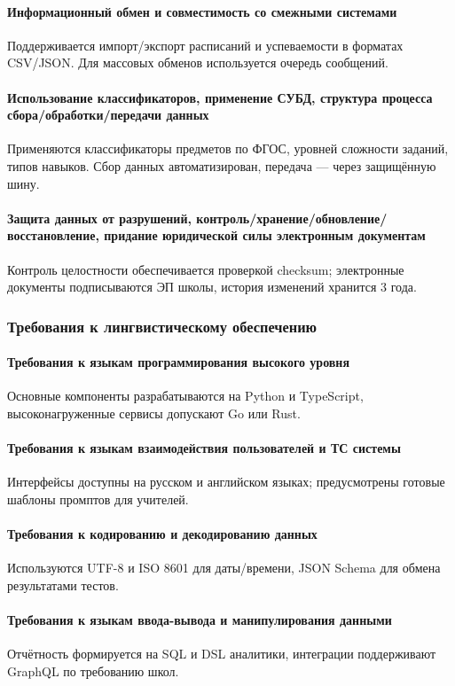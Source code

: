 \documentclass[14pt,a4paper]{extarticle}
\begin{document}
\paragraph{Информационный обмен и совместимость со смежными системами} Поддерживается импорт/экспорт расписаний и успеваемости в форматах CSV/JSON. Для массовых обменов используется очередь сообщений.
\paragraph{Использование классификаторов, применение СУБД, структура процесса сбора/обработки/передачи данных} Применяются классификаторы предметов по ФГОС, уровней сложности заданий, типов навыков. Сбор данных автоматизирован, передача — через защищённую шину.
\paragraph{Защита данных от разрушений, контроль/хранение/обновление/восстановление, придание юридической силы электронным документам} Контроль целостности обеспечивается проверкой checksum; электронные документы подписываются ЭП школы, история изменений хранится 3 года.

\subsubsection{Требования к лингвистическому обеспечению}
\paragraph{Требования к языкам программирования высокого уровня} Основные компоненты разрабатываются на Python и TypeScript, высоконагруженные сервисы допускают Go или Rust.
\paragraph{Требования к языкам взаимодействия пользователей и ТС системы} Интерфейсы доступны на русском и английском языках; предусмотрены готовые шаблоны промптов для учителей.
\paragraph{Требования к кодированию и декодированию данных} Используются UTF-8 и ISO 8601 для даты/времени, JSON Schema для обмена результатами тестов.
\paragraph{Требования к языкам ввода-вывода и манипулирования данными} Отчётность формируется на SQL и DSL аналитики, интеграции поддерживают GraphQL по требованию школ.
\end{document}
